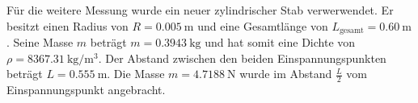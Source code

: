Für die weitere Messung wurde ein neuer zylindrischer Stab verwerwendet. 
Er besitzt einen Radius von $R = \SI{0.005}{\meter}$ und eine Gesamtlänge von $L_\text{gesamt} = \SI{0.60}{\meter} $. 
Seine Masse $m$ beträgt $m = \SI{0.3943}{\kilogram}$ und hat somit eine Dichte von $\rho = \SI{8367.31}{\kilogram \per \cubic\meter}$. 
Der Abstand zwischen den beiden Einspannungspunkten beträgt $L = \SI{0.555}{\meter}$. 
Die Masse $m = \SI{4.7188}{\newton}$ wurde im Abstand $\frac{L}{2}$ vom Einspannungspunkt angebracht. 

\begin{table}
    \centering
    \caption{Messergebnisse zu dem beidseitig eingespannten zylindrischen Stab}
    \label{tab:beidseitig_rund}
\end{table}

